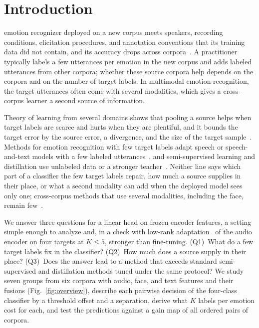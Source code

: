 \section{Introduction}
\label{sec:introduction}

 emotion recognizer deployed on a new corpus meets speakers, recording conditions, elicitation procedures, and annotation conventions that its training data did not contain, and its accuracy drops across corpora~\cite{schuller2010crosscorpus,gideon2021addog,feng2023fewshot}.
A practitioner typically labels a few utterances per emotion in the new corpus and adds labeled utterances from other corpora; whether these source corpora help depends on the corpora and on the number of target labels.
In multimodal emotion recognition, the target utterances often come with several modalities, which gives a cross-corpus learner a second source of information.

Theory of learning from several domains shows that pooling a source helps when target labels are scarce and hurts when they are plentiful, and it bounds the target error by the source error, a divergence, and the size of the target sample~\cite{bendavid2010theory,blitzer2007learning,desilva2023value}.
Methods for emotion recognition with few target labels adapt speech or speech-and-text models with a few labeled utterances~\cite{feng2023fewshot,he2025m4ser,zaidi2024enhancing}, and semi-supervised learning and distillation use unlabeled data or a stronger teacher~\cite{lee2013pseudolabel,hinton2015distilling,lopezpaz2016unifying}.
Neither line says which part of a classifier the few target labels repair, how much a source supplies in their place, or what a second modality can add when the deployed model sees only one; cross-corpus methods that use several modalities, including the face, remain few~\cite{ahn2025multitask}.

We answer three questions for a linear head on frozen encoder features, a setting simple enough to analyze and, in a check with low-rank adaptation~\cite{hu2022lora} of the audio encoder on four targets at $K \le 5$, stronger than fine-tuning.
(Q1)~What do a few target labels fix in the classifier?
(Q2)~How much does a source supply in their place?
(Q3)~Does the answer lead to a method that exceeds standard semi-supervised and distillation methods tuned under the same protocol?
We study seven groups from six corpora with audio, face, and text features and their fusions (Fig.~\ref{fig:overview}), describe each pairwise decision of the four-class classifier by a threshold offset and a separation, derive what $K$ labels per emotion cost for each, and test the predictions against a gain map of all ordered pairs of corpora.

